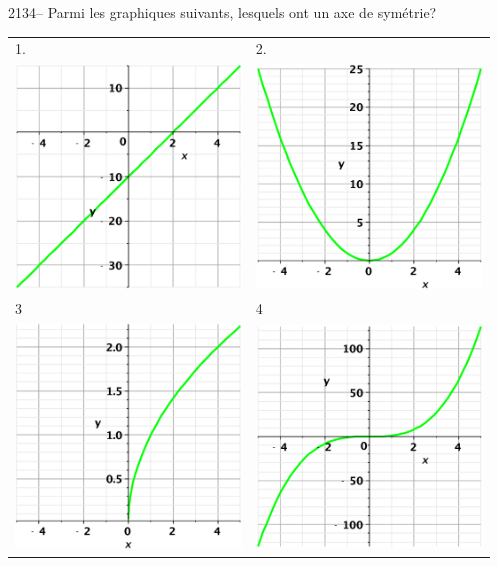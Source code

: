 \documentclass[letterpaper, 12pt]{article}
\begin{document}
2134-- Parmi les graphiques suivants, lesquels ont un axe de sym\'etrie?\\
\begin{tabular}{l l}
1. & 2. \\
 \includegraphics[width=6cm,bb=20 118 575 673]{Q2134a.eps}
&
 \includegraphics[width=6cm,bb=20 118 575 673]{Q2134b.eps}
\\
3 & 4 \\
 \includegraphics[width=6cm,bb=20 118 575 673]{Q2134c.eps}
&
 \includegraphics[width=6cm,bb=20 118 575 673]{Q2134d.eps}


\end{tabular}
\end{document}
